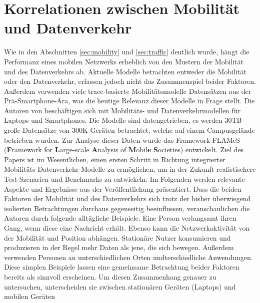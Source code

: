 \documentclass[12pt, a4paper]{article}
\begin{document}
\vfill

\pagebreak

\section{Korrelationen zwischen Mobilität und Datenverkehr}

Wie in den Abschnitten \ref{sec:mobility} und \ref{sec:traffic} deutlich wurde, hängt die Performanz eines mobilen
Netzwerks erheblich von den Mustern der Mobilität und des Datenverkehrs ab.
\newline\newline
Aktuelle Modelle betrachten entweder die Mobilität oder den Datenverkehr, erfassen jedoch nicht das Zusammenspiel beider Faktoren.
Außerdem verwenden viele trace-basierte Mobilitätsmodelle Datensätzen aus der Prä-Smartphone-Ära,
was die heutige Relevanz dieser Modelle in Frage stellt. \cite{Alipour2018}\newline
Die Autoren von \cite{Alipour2018} beschäftigen sich mit Mobilitäts- und Datenverkehrmodellen für Laptops und Smartphones.
Die Modelle sind datengetrieben, es werden $30$\textsc{TB} große Datensätze von $300$\textsc{K} Geräten betrachtet, welche auf einem Campusgelände
betrieben wurden. Zur Analyse dieser Daten wurde das Framework FLAMeS (\textbf{F}ramework for \textbf{L}arge-scale \textbf{A}nalysis of \textbf{M}obil\textbf{e} \textbf{S}ocieties) entwickelt.
Ziel des Papers ist im Wesentlichen, einen ersten Schritt in Richtung integrierter Mobilitäts-Datenverkehr-Modelle 
zu ermöglichen, um in der Zukunft realistischere Test-Szenarien und Benchmarks zu entwickeln. Im Folgenden werden relevante
Aspekte und Ergebnisse aus der Veröffentlichung präsentiert.\newline
Dass die beiden Faktoren der Mobilität und des Datenverkehrs sich trotz der bisher überwiegend isolierten Betrachtungen
durchaus gegenseitig beeinflussen, veranschaulichen die Autoren durch folgende alltägliche Beispiele. 
Eine Person verlangsamt ihren Gang, wenn diese eine Nachricht erhält. Ebenso kann die Netzwerkaktivität von der
Mobilität und Position abhängen. Stationäre Nutzer konsumieren und produzieren in der Regel mehr Daten als jene, 
die sich bewegen. Außerdem verwenden Personen an unterschiedlichen Orten undterschiedliche Anwendungen.
Diese simplen Beispiele lassen eine gemeinsame Betrachtung beider Faktoren bereits als sinnvoll erscheinen.
\newline\newline
Um diesen Zusammenhang genauer zu untersuchen, unterscheiden sie zwischen stationären Geräten (Laptops) und mobilen Geräten
\end{document}
